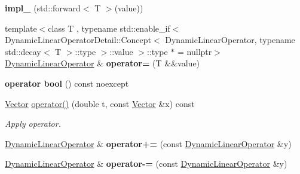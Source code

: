 \begin{DoxyCompactItemize}
\item 
\hypertarget{classSpacy_1_1DynamicLinearOperator_a63de0ecf02daa1697b452117cb1399f2}{{\bfseries impl\-\_\-} (std\-::forward$<$ T $>$(value))}\label{classSpacy_1_1DynamicLinearOperator_a63de0ecf02daa1697b452117cb1399f2}

\item 
\hypertarget{classSpacy_1_1DynamicLinearOperator_ab3bf64c6af574e7bbf76ce1565c978b4}{{\footnotesize template$<$class T , typename std\-::enable\-\_\-if$<$ Dynamic\-Linear\-Operator\-Detail\-::\-Concept$<$ Dynamic\-Linear\-Operator, typename std\-::decay$<$ T $>$\-::type $>$\-::value $>$\-::type $\ast$  = nullptr$>$ }\\\hyperlink{classSpacy_1_1DynamicLinearOperator}{Dynamic\-Linear\-Operator} \& {\bfseries operator=} (T \&\&value)}\label{classSpacy_1_1DynamicLinearOperator_ab3bf64c6af574e7bbf76ce1565c978b4}

\item 
\hypertarget{classSpacy_1_1DynamicLinearOperator_a8e59ff2dc6fa7f91c461c1af20bb81fb}{{\bfseries operator bool} () const noexcept}\label{classSpacy_1_1DynamicLinearOperator_a8e59ff2dc6fa7f91c461c1af20bb81fb}

\item 
\hypertarget{classSpacy_1_1DynamicLinearOperator_a436759e2a2a59d57127e317d6b809349}{\hyperlink{classSpacy_1_1Vector}{Vector} \hyperlink{classSpacy_1_1DynamicLinearOperator_a436759e2a2a59d57127e317d6b809349}{operator()} (double t, const \hyperlink{classSpacy_1_1Vector}{Vector} \&x) const }\label{classSpacy_1_1DynamicLinearOperator_a436759e2a2a59d57127e317d6b809349}

\begin{DoxyCompactList}\small\item\em Apply operator. \end{DoxyCompactList}\item 
\hypertarget{classSpacy_1_1DynamicLinearOperator_a6696204e09787916f1dec88319fdcdb2}{\hyperlink{classSpacy_1_1DynamicLinearOperator}{Dynamic\-Linear\-Operator} \& {\bfseries operator+=} (const \hyperlink{classSpacy_1_1DynamicLinearOperator}{Dynamic\-Linear\-Operator} \&y)}\label{classSpacy_1_1DynamicLinearOperator_a6696204e09787916f1dec88319fdcdb2}

\item 
\hypertarget{classSpacy_1_1DynamicLinearOperator_a8a7283da8c551442f8e4e0372e088f41}{\hyperlink{classSpacy_1_1DynamicLinearOperator}{Dynamic\-Linear\-Operator} \& {\bfseries operator-\/=} (const \hyperlink{classSpacy_1_1DynamicLinearOperator}{Dynamic\-Linear\-Operator} \&y)}\label{classSpacy_1_1DynamicLinearOperator_a8a7283da8c551442f8e4e0372e088f41}


\end{DoxyCompactItemize}
